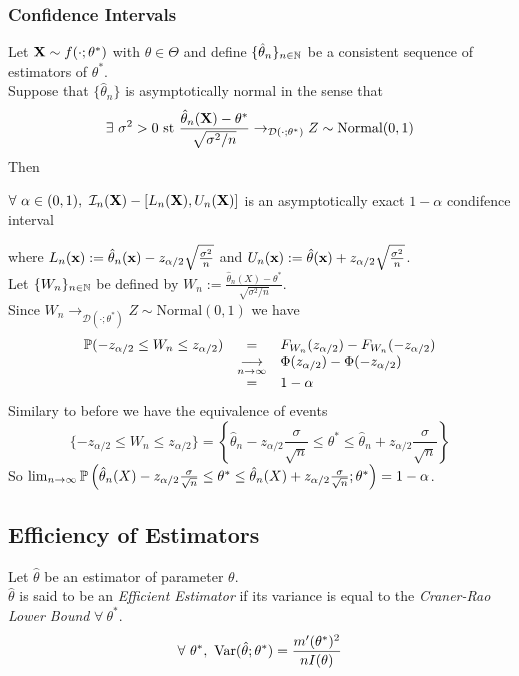 \documentclass[11pt,a4paper]{article}
\begin{document}
\subsubsection{Confidence Intervals}

Let $\textbf{X}\sim f(\cdot;\theta^*)$ with $\theta\in\Theta$ and define $\{\hat\theta_n\}_{n\in\mathbb{N}}$ be a consistent sequence of estimators of $\theta^*$.\\
Suppose that $\{\hat\theta_n\}$ is asymptotically normal in the sense that
$$\exists\ \sigma^2>0\text{ st }\frac{\hat{\theta}_n(\textbf{X})-\theta^*}{\sqrt{\sigma^2/n}}\to_{\mathcal{D}(\cdot;\theta^*)}Z\sim\text{Normal}(0,1)$$
Then
\begin{center}$\forall\ \alpha\in(0,1),\ \mathcal{I}_n(\X)-[L_n(\X),U_n(\X)]$ is an asymptotically exact $1-\alpha$ condifence interval\end{center}
where $L_n(\textbf{x}):=\hat{\theta}_n(\textbf{x})-z_{\alpha/2}\sqrt{\frac{\sigma^2}{n}}$ and $U_n(\textbf{x}):=\hat{\theta}(\textbf{x})+z_{\alpha/2}\sqrt{\frac{\sigma^2}{n}}$.\\

Let $\{W_n\}_{n\in\mathbb{N}}$ be defined by $W_n:=\frac{\hat{\theta}_n(X)-\theta^*}{\sqrt{\sigma^2/n}}$.\\
Since $W_n\to_{\mathcal{D}(\cdot;\theta^*)}Z\sim\text{Normal}(0,1)$ we have
\[\begin{array}{rcl}
\mathbb{P}(-z_{\alpha/2}\leq W_n\leq z_{\alpha/2})&=&F_{W_n}(z_{\alpha/2})-F_{W_n}(-z_{\alpha/2})\\
&\underset{n\to\infty}{\longrightarrow}&\Phi(z_{\alpha/2})-\Phi(-z_{\alpha/2})\\
&=&1-\alpha
\end{array}\]
Similary to before we have the equivalence of events
$$\{-z_{\alpha/2}\leq W_n\leq z_{\alpha/2}\}=\left\{\hat{\theta}_n-z_{\alpha/2}\frac{\sigma}{\sqrt{n}}\leq\theta^*\leq\hat{\theta}_n+z_{\alpha/2}\frac{\sigma}{\sqrt{n}}\right\}$$
So $\lim_{n\to\infty}\mathbb{P}\left(\hat{\theta}_n(X)-z_{\alpha/2}\frac{\sigma}{\sqrt{n}}\leq\theta^*\leq\hat{\theta}_n(X)+z_{\alpha/2}\frac{\sigma}{\sqrt{n}};\theta^*\right)=1-\alpha$.\proved


\subsection{Efficiency of Estimators}

Let $\hat\theta$ be an estimator of parameter $\theta$.\\
$\hat\theta$ is said to be an \textit{Efficient Estimator} if its variance is equal to the \textit{Craner-Rao Lower Bound} $\forall\ \theta^*$.
$$\forall\ \theta^*,\ \var(\hat\theta;\theta^*)=\frac{m'(\theta^*)^2}{nI(\theta)}$$
\end{document}
